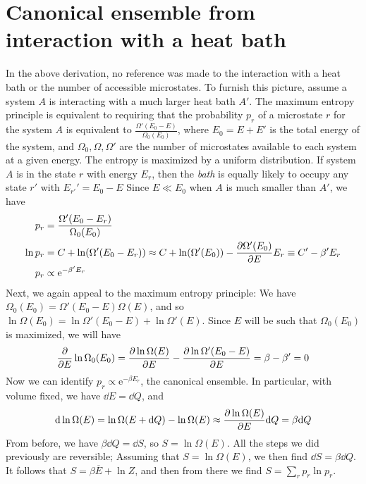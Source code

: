 \documentclass[11pt]{article}
\theoremstyle{remark}
\newcommand{\e}{\mathrm{e}}
\begin{document}
\section{Canonical ensemble from interaction with a heat bath}
In the above derivation, no reference was made to the interaction with a heat
bath or the number of accessible microstates. To furnish this picture, assume a
system $A$ is interacting with a much larger heat bath $A'$. The maximum entropy
principle is equivalent to requiring that the probability $p_r$ of a microstate
$r$ for the system $A$ is equivalent to $\frac{\Omega'(E_0-E)}{\Omega_0(E_0)}$,
where $E_0 = E + E'$ is the total energy of the system, and $\Omega_0, \Omega,
\Omega'$ are the number of microstates available to each system at a given
energy. The entropy is maximized by a uniform distribution. If system $A$ is in
the state $r$ with energy $E_r$, then the \emph{bath} is equally likely to
occupy any state
$r'$ with $E_{r'}' = E_0-E$ Since $E \ll E_0$ when $A$ is much smaller than
$A'$, we have
\begin{align}
  p_r &= \frac{\Omega'(E_0-E_r)}{\Omega_0(E_0)} \\
  \ln p_r &= C + \ln(\Omega' (E_0-E_r)) \approx C + \ln(\Omega'(E_0)) - \pdv{\Omega'(E_0)}{E}E_r \equiv C' - \beta' E_r \\
  p_r &\propto \e^{-\beta' E_r}
\end{align}
Next, we again appeal to the maximum entropy principle: We have $\Omega_0(E_0) =
\Omega'(E_0-E)\Omega(E)$, and so $\ln \Omega(E_0) = \ln \Omega'(E_0-E) + \ln
\Omega'(E)$. Since $E$ will be such that $\Omega_0(E_0)$ is maximized, we will have
\begin{align}
\pdv{E} \ln \Omega_0(E_0) = \pdv{\ln \Omega(E)}{E} - \pdv{\ln \Omega'(E_0 -E)}{E} = \beta - \beta' = 0
\end{align}
Now we can identify $p_r \propto \e^{-\beta E_r}$, the canonical ensemble. In particular,
with volume fixed, we have $\dd E = \dd Q$, and 
\begin{align}
\dd\ln \Omega(E) = \ln \Omega(E+\dd Q) - \ln \Omega(E) \approx \pdv{\ln \Omega(E)}{E}\dd Q = \beta \dd Q
\end{align}
From before, we have $\beta \dd Q = \dd S$, so $S = \ln \Omega(E)$. All the steps we
did previously are reversible; Assuming that $S = \ln \Omega(E)$, we then find
$\dd S = \beta \dd Q$. It follows that $S = \beta \overline E + \ln Z$,
and then from there we find $S = \sum_{r}p_r \ln p_r$.



\end{document}
